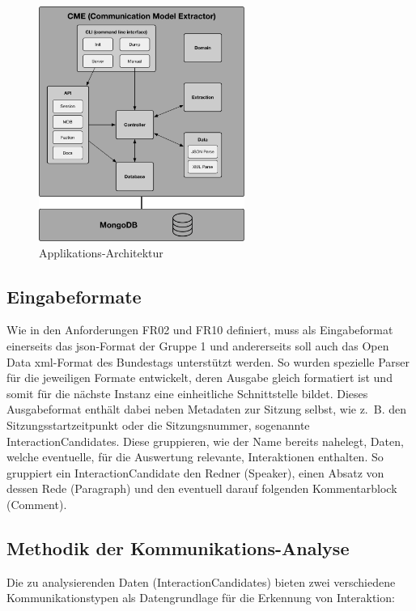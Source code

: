 \begin{figure}[ht]
    \begin{center}
        \includegraphics[width=0.6\textwidth]{images/03-cme/Project-Modules.pdf}
    \end{center}
    \caption{Applikations-Architektur}
    \label{fig:03_project_structure}
\end{figure}

\subsection{Eingabeformate}
Wie in den Anforderungen FR02 und FR10 definiert, muss als Eingabeformat
einerseits das \gls{json}-Format der Gruppe 1 und andererseits soll auch das
Open Data \gls{xml}-Format des Bundestags unterstützt werden. So wurden
spezielle Parser für die jeweiligen Formate entwickelt, deren Ausgabe gleich
formatiert ist und somit für die nächste Instanz eine einheitliche
Schnittstelle bildet. Dieses Ausgabeformat enthält dabei neben Metadaten zur
Sitzung selbst, wie z.~B. den Sitzungsstartzeitpunkt oder die Sitzungsnummer,
sogenannte InteractionCandidates. Diese gruppieren, wie der Name bereits
nahelegt, Daten, welche eventuelle, für die Auswertung relevante, Interaktionen
enthalten. So gruppiert ein InteractionCandidate den Redner (Speaker),
einen Absatz von dessen Rede (Paragraph) und den eventuell darauf folgenden
Kommentarblock (Comment).

\subsection{Methodik der Kommunikations-Analyse}
Die zu analysierenden Daten (InteractionCandidates) bieten zwei verschiedene
Kommunikationstypen als Datengrundlage für die Erkennung von Interaktion:

